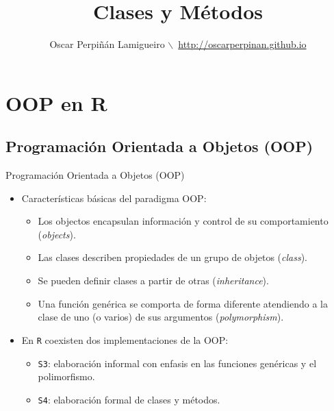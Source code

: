\documentclass[xcolor={usenames,svgnames,dvipsnames}]{beamer}
\author{Oscar Perpiñán Lamigueiro $\backslash$\ \url{http://oscarperpinan.github.io}}
\date{}
\title{Clases y Métodos}
\begin{document}
\maketitle

\section{OOP en R}
\label{sec:orgff3e80a}
\subsection{Programación Orientada a Objetos (OOP)}
\label{sec:orgbc10655}

\begin{frame}[fragile,label={sec:orgca23043}]{Programación Orientada a Objetos (OOP)}
 \begin{itemize}
\item Características básicas del paradigma OOP:
\begin{itemize}
\item Los objectos encapsulan información y control de su comportamiento (\emph{objects}).
\item Las clases describen propiedades de un grupo de objetos (\emph{class}).
\item Se pueden definir clases a partir de otras (\emph{inheritance}).
\item Una función genérica se comporta de forma diferente atendiendo a la
clase de uno (o varios) de sus argumentos (\emph{polymorphism}).
\end{itemize}
\item En \texttt{R} coexisten dos implementaciones de la OOP:
\begin{itemize}
\item \texttt{S3}: elaboración informal con enfasis en las funciones genéricas y el polimorfismo.
\item \texttt{S4}: elaboración formal de clases y métodos.
\end{itemize}
\end{itemize}
\end{frame}
\end{document}
